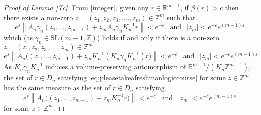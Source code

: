 \documentclass[10pt,reqno]{amsart}
\theoremstyle{Theorem}
\theoremstyle{definition}
\theoremstyle{remark}
\newcommand{\R}{\mathbb {R}}
\newcommand{\Z}{\mathbb {Z}}
\newcommand{\Sl}{\mathrm{SL}}
\newcommand{\inv}{^{-1}}
\def\blue{}
\begin{document}
\begin{proof}[Proof of Lemma \ref{Tc}]
From  \eqref{integer}, given any   $r \in \R^{m-1}$, if $\beta(r) > c$ then there exists a  non-zero $z = (z_1,z_2,z_3, .... , z_{m}) \in \Z^m$ such that
\[ e^s\left\| A_n\gamma_n
(z_1, \dots, z_{m-1})
 +
 z_mA_n\gamma_n K_n\inv
r
\right\|  < e^{-c}
\ \ \text{ and } \ \
|z_m| < e^{-c} e^{(m-1)s}
\]
which (as $\gamma_n \in \Sl(m-1, \Z)$) holds if and only if there is a non-zero $z = (z_1,z_2,z_3, .... , z_{m}) \in \Z^m$
\begin{equation}\label{eq:pleasetakeafreshmanlogiccourse} e^s\left\| A_n \Big(
(z_1, \dots, z_{m-1})
 +
 z_mK_n\inv (K_n\gamma_n K_n\inv) r
\Big)
\right\| < e^{-c}
\ \ \text{ and } \ \
|z_m| < e^{-c} e^{(m-1)s}
\end{equation}
As $K_n\gamma_n K_n\inv$ induces a volume-preserving automorphism of $\R^{m-1}/(K_n\Z^{m-1})$, the set of $r\in D_n$ satisfying \eqref{eq:pleasetakeafreshmanlogiccourse}  {\blue for some $z\in \Z^m$} has the same measure as the set of $r\in D_n$ satisfying
$$e^s\left\| A_n \Big(
(z_1, \dots, z_{m-1})
 +
 z_mK_n\inv   r
\Big)
\right\| < e^{-c}
\ \ \text{ and } \ \
|z_m| < e^{-c} e^{(m-1)s}$$
{\blue for some $z\in \Z^m.$}


\end{proof}
\end{document}
